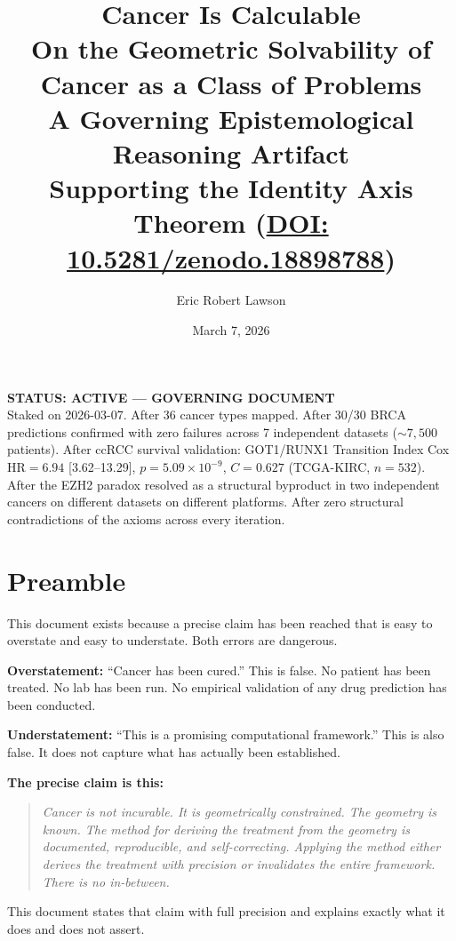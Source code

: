 \documentclass[11pt, a4paper]{article}
\title{
    \vspace{-1em}
    \textbf{Cancer Is Calculable}\\[0.5em]
    \large On the Geometric Solvability of Cancer
    as a Class of Problems\\[0.4em]
    \normalsize A Governing Epistemological
    Reasoning Artifact\\[0.3em]
    \small Supporting the Identity Axis Theorem
    (\href{https://doi.org/10.5281/zenodo.18898788}
    {DOI: 10.5281/zenodo.18898788})
}
\author[1]{Eric Robert Lawson}
\affil[1]{OrganismCore (Independent Research)
    \textbar{}
    \href{mailto:OrganismCore@proton.me}
    {OrganismCore@proton.me} \textbar{}
    ORCID:
    \href{https://orcid.org/0009-0002-0414-6544}
    {0009-0002-0414-6544}}
\date{March 7, 2026}
\begin{document}
\maketitle
\thispagestyle{fancy}

\begin{mdframed}[backgroundcolor=recordbox,
                 linecolor=green!50!black,
                 linewidth=1pt]
\textbf{STATUS: ACTIVE --- GOVERNING DOCUMENT}\\[0.4em]
Staked on 2026-03-07. After 36 cancer types mapped.
After 30/30 BRCA predictions confirmed with zero failures
across 7 independent datasets (${\sim}7{,}500$ patients).
After ccRCC survival validation: GOT1/RUNX1 Transition Index
Cox HR${}=6.94$ [3.62--13.29], $p=5.09{\times}10^{-9}$,
$C=0.627$ (TCGA-KIRC, $n=532$).
After the EZH2 paradox resolved as a structural byproduct
in two independent cancers on different datasets on
different platforms. After zero structural contradictions
of the axioms across every iteration.
\end{mdframed}

\vspace{0.5em}
\tableofcontents
\newpage

\section{Preamble}

\begin{mdframed}[backgroundcolor=claimbox,
                 linecolor=blue!40!black,
                 linewidth=1pt]
This document exists because a precise claim has been
reached that is easy to overstate and easy to understate.
Both errors are dangerous.

\medskip
\textbf{Overstatement:} ``Cancer has been cured.''
This is false. No patient has been treated. No lab has
been run. No empirical validation of any drug prediction
has been conducted.

\medskip
\textbf{Understatement:} ``This is a promising computational
framework.'' This is also false. It does not capture what
has actually been established.

\medskip
\textbf{The precise claim is this:}

\begin{quote}
\itshape
Cancer is not incurable. It is geometrically constrained.
The geometry is known. The method for deriving the treatment
from the geometry is documented, reproducible, and
self-correcting. Applying the method either derives the
treatment with precision or invalidates the entire framework.
There is no in-between.
\end{quote}

This document states that claim with full precision and
explains exactly what it does and does not assert.
\end{mdframed}
\end{document}
